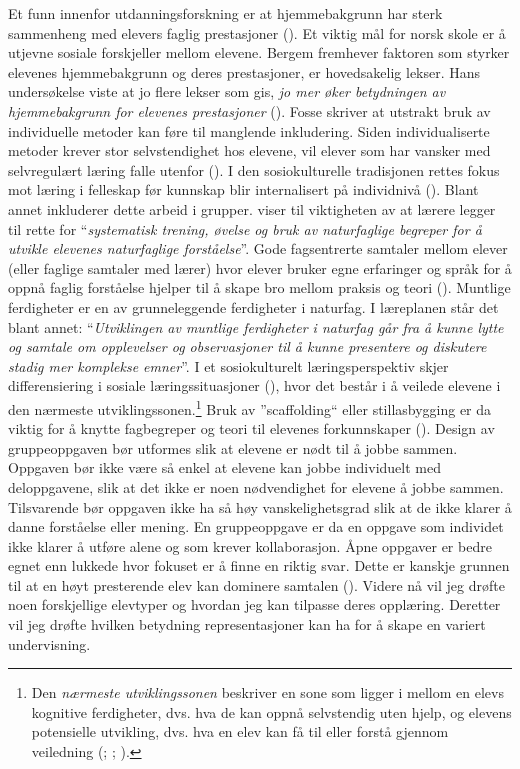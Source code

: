 \documentclass[main.tex]{subfiles}
\begin{document}
Et funn innenfor utdanningsforskning er at hjemmebakgrunn har sterk sammenheng med elevers faglig prestasjoner (). Et viktig mål for norsk skole er å utjevne sosiale forskjeller mellom elevene. Bergem fremhever faktoren som styrker elevenes hjemmebakgrunn og deres prestasjoner, er hovedsakelig lekser. Hans undersøkelse viste at jo flere lekser som gis, \emph{jo mer øker betydningen av hjemmebakgrunn for elevenes prestasjoner} (). Fosse skriver at utstrakt bruk av individuelle metoder kan føre til manglende inkludering. Siden individualiserte metoder krever stor selvstendighet hos elevene, vil elever som har vansker med selvregulært læring falle utenfor (). 
\newline\newline
I den sosiokulturelle tradisjonen rettes fokus mot læring i felleskap før kunnskap blir internalisert på individnivå (). Blant annet inkluderer dette arbeid i grupper.  viser til viktigheten av at lærere legger til rette for ``\emph{systematisk trening, øvelse og bruk av naturfaglige begreper for å utvikle elevenes naturfaglige forståelse}''. Gode fagsentrerte samtaler mellom elever (eller faglige samtaler med lærer) hvor elever bruker egne erfaringer og språk for å oppnå faglig forståelse hjelper til å skape bro mellom praksis og teori (). 
\newline\newline
Muntlige ferdigheter er en av grunneleggende ferdigheter i naturfag. I læreplanen står det blant annet: ``\emph{Utviklingen av muntlige ferdigheter i naturfag går fra å kunne lytte og samtale om opplevelser og observasjoner til å kunne presentere og diskutere stadig mer komplekse emner}''. I et sosiokulturelt læringsperspektiv skjer differensiering i sosiale læringssituasjoner (), hvor det består i å veilede elevene i den nærmeste utviklingssonen.\footnote[2]{Den \emph{nærmeste utviklingssonen} beskriver en sone som ligger i mellom en elevs kognitive ferdigheter, dvs. hva de kan oppnå selvstendig uten hjelp, og elevens potensielle utvikling, dvs. hva en elev kan få til eller forstå gjennom veiledning (; ; ).} Bruk av ''scaffolding`` eller stillasbygging er da viktig for å knytte fagbegreper og teori til elevenes forkunnskaper ().
\newline\newline
Design av gruppeoppgaven bør utformes slik at elevene er nødt til å jobbe sammen. Oppgaven bør ikke være så enkel at elevene kan jobbe individuelt med deloppgavene, slik at det ikke er noen nødvendighet for elevene å jobbe sammen. Tilsvarende bør oppgaven ikke ha så høy vanskelighetsgrad slik at de ikke klarer å danne forståelse eller mening. En gruppeoppgave er da en oppgave som individet ikke klarer å utføre alene og som krever kollaborasjon. Åpne oppgaver er bedre egnet enn lukkede hvor fokuset er å finne en riktig svar. Dette er kanskje grunnen til at en høyt presterende elev kan dominere samtalen ().
\newline\newline
Videre nå vil jeg drøfte noen forskjellige elevtyper og hvordan jeg kan tilpasse deres opplæring. Deretter vil jeg drøfte hvilken betydning representasjoner kan ha for å skape en variert undervisning.
\end{document}
